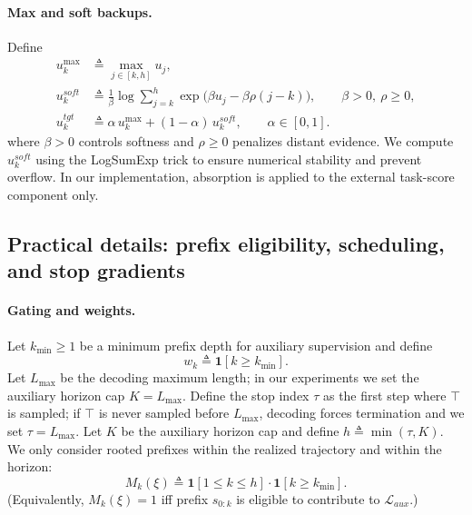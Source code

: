 \documentclass{article}
\theoremstyle{plain}
\theoremstyle{definition}
\theoremstyle{remark}
\begin{document}
\paragraph{Max and soft backups.}
Define
\begin{align}
\label{eq:app_backup_defs}
u_k^{\max}
&\triangleq \max_{j\in[k,h]} u_j,\\
u_k^{soft}
&\triangleq
\frac{1}{\beta}\log \sum_{j=k}^{h}\exp\!\Big(\beta u_j - \beta\rho(j-k)\Big),\qquad \beta>0,\ \rho\ge 0,\\
u_k^{tgt}
&\triangleq
\alpha\,u_k^{\max} + (1-\alpha)\,u_k^{soft},\qquad \alpha\in[0,1].
\end{align}
where $\beta>0$ controls softness and $\rho\ge0$ penalizes distant evidence. We compute $u_k^{soft}$ using the LogSumExp trick to ensure numerical stability and prevent overflow.
In our implementation, absorption is applied to the external task-score component only.


\subsection{Practical details: prefix eligibility, scheduling, and stop gradients}
\label{app:raptb_impl}

\paragraph{Gating and weights.}
Let $k_{\min}\ge 1$ be a minimum prefix depth for auxiliary supervision and define
\begin{equation}
\label{eq:app_wk2_fix}
w_k \triangleq \mathbf{1}[k\ge k_{\min}].
\end{equation}
Let $L_{\max}$ be the decoding maximum length; in our experiments we set the auxiliary horizon cap $K=L_{\max}$.
Define the stop index $\tau$ as the first step where $\top$ is sampled; if $\top$ is never sampled before $L_{\max}$, decoding forces termination and we set $\tau=L_{\max}$.
Let $K$ be the auxiliary horizon cap and define $h \triangleq \min(\tau,K)$.
We only consider rooted prefixes within the realized trajectory and within the horizon:
\begin{equation}
\label{eq:app_mask_def_fix}
M_k(\xi)\triangleq \mathbf{1}[1\le k\le h]\cdot \mathbf{1}[k\ge k_{\min}].
\end{equation}
(Equivalently, $M_k(\xi)=1$ iff prefix $s_{0:k}$ is eligible to contribute to $\mathcal{L}_{aux}$.)
\end{document}
